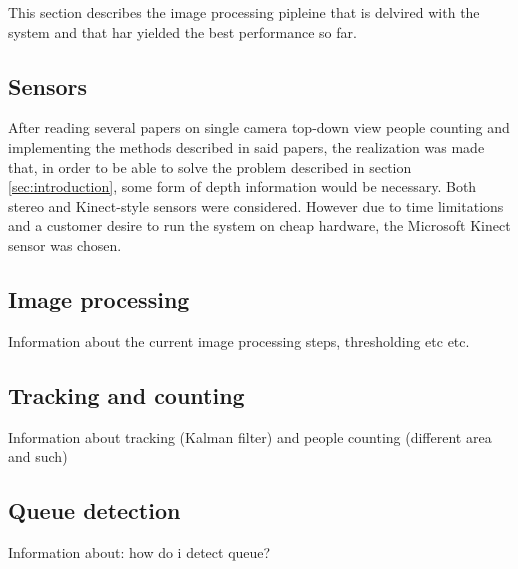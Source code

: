 This section describes the image processing pipleine that is delvired with the system and that har yielded the best performance so far.

\subsection{Sensors}
After reading several papers on single camera top-down view people counting and implementing the methods described in said papers, the realization was made that, in order to be able to solve the problem described in section \ref{sec:introduction}, some form of depth information would be necessary. Both stereo and Kinect-style sensors were considered. However due to time limitations and a customer desire to run the system on cheap hardware, the Microsoft Kinect sensor was chosen.

\subsection{Image processing}
Information about the current image processing steps, thresholding etc etc.

\subsection{Tracking and counting}
Information about tracking (Kalman filter) and people counting (different area and such)

\subsection{Queue detection}
Information about: how do i detect queue?

